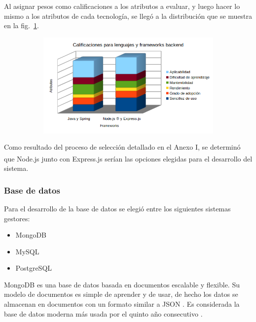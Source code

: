 \documentclass{article}
\begin{document}
Al asignar pesos como calificaciones a los atributos a evaluar, y luego hacer lo mismo a los atributos de cada tecnología, se llegó a la distribución que se muestra en la fig.~\ref{fig:lenguajesFrameworksBackend}.
\begin{figure}[H]
	\caption{Calificaciones para lenguajes y frameworks backend}
    \begin{subfigure}{1\textwidth}
	\includegraphics[width=1\textwidth]{calificaciones para lenguajes y frameworks backend.png}
    \end{subfigure}
	\label{fig:lenguajesFrameworksBackend}
\end{figure}
\vspace{-1.0\baselineskip}
Como resultado del proceso de selección detallado en el Anexo I, se determinó que Node.js\textsuperscript{\textregistered} junto con Express.js serían las opciones elegidas para el desarrollo del sistema.
\subsubsection{Base de datos}
Para el desarrollo de la base de datos se elegió entre los siguientes sistemas gestores:
\begin{itemize}
    \item MongoDB
    \item MySQL
    \item PostgreSQL
\end{itemize}
MongoDB es una base de datos basada en documentos escalable y flexible. Su modelo de documentos es simple de aprender y de usar, de hecho los datos se almacenan en documentos con un formato similar a JSON \parencite{whatIsMongoDBOfficial}. Es considerada la base de datos moderna más usada por el quinto año consecutivo \parencite{mongoOfficialHome}.
\end{document}
